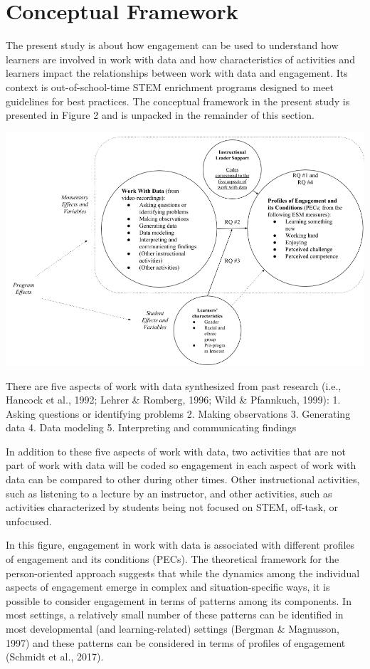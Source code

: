 \documentclass[]{msu-thesis}
\theoremstyle{definition}
\theoremstyle{definition}
\theoremstyle{definition}
\theoremstyle{remark}
\begin{document}
\section{Conceptual Framework}\label{conceptual-framework}

The present study is about how engagement can be used to understand how
learners are involved in work with data and how characteristics of
activities and learners impact the relationships between work with data
and engagement. Its context is out-of-school-time STEM enrichment
programs designed to meet guidelines for best practices. The conceptual
framework in the present study is presented in Figure 2 and is unpacked
in the remainder of this section.

\begin{center}\includegraphics[width=0.8\linewidth]{images/figure2} \end{center}

There are five aspects of work with data synthesized from past research
(i.e., Hancock et al., 1992; Lehrer \& Romberg, 1996; Wild \& Pfannkuch,
1999): 1. Asking questions or identifying problems 2. Making
observations 3. Generating data 4. Data modeling 5. Interpreting and
communicating findings

In addition to these five aspects of work with data, two activities that
are not part of work with data will be coded so engagement in each
aspect of work with data can be compared to other during other times.
Other instructional activities, such as listening to a lecture by an
instructor, and other activities, such as activities characterized by
students being not focused on STEM, off-task, or unfocused.

In this figure, engagement in work with data is associated with
different profiles of engagement and its conditions (PECs). The
theoretical framework for the person-oriented approach suggests that
while the dynamics among the individual aspects of engagement emerge in
complex and situation-specific ways, it is possible to consider
engagement in terms of patterns among its components. In most settings,
a relatively small number of these patterns can be identified in most
developmental (and learning-related) settings (Bergman \& Magnusson,
1997) and these patterns can be considered in terms of profiles of
engagement (Schmidt et al., 2017).
\end{document}
